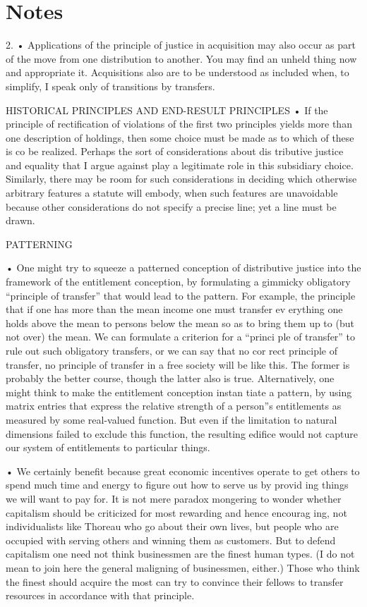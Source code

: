 \documentclass[11pt,openany]{book}
\newcommand{\booknoteshead}{%
  \phantomsection\section*{Notes}%
  \addcontentsline{toc}{section}{Notes}\markright{Notes}}
\begin{document}
\booknoteshead

{\footnotesize\setlength{\parindent}{0pt}\setlength{\parskip}{5pt}

2. • Applications of the principle of justice in acquisition may also occur as part of the move from one distribution to another. You may find an unheld thing now and appropriate it. Acquisitions also are to be understood as included when, to simplify, I speak only of transitions by transfers.\par

HISTORICAL PRINCIPLES AND END-RESULT PRINCIPLES • If the principle of rectification of violations of the first two principles yields more than one description of holdings, then some choice must be made as to which of these is co be realized. Perhaps the sort of considerations about dis tributive justice and equality that I argue against play a legitimate role in this subsidiary choice. Similarly, there may be room for such considerations in deciding which otherwise arbitrary features a statute will embody, when such features are unavoidable because other considerations do not specify a precise line; yet a line must be drawn.\par

PATTERNING\par

• One might try to squeeze a patterned conception of distributive justice into the framework of the entitlement conception, by formulating a gimmicky obligatory ``principle of transfer'' that would lead to the pattern. For example, the principle that if one has more than the mean income one must transfer ev erything one holds above the mean to persons below the mean so as to bring them up to (but not over) the mean. We can formulate a criterion for a ``princi ple of transfer'' to rule out such obligatory transfers, or we can say that no cor rect principle of transfer, no principle of transfer in a free society will be like this. The former is probably the better course, though the latter also is true. Alternatively, one might think to make the entitlement conception instan tiate a pattern, by using matrix entries that express the relative strength of a person''s entitlements as measured by some real-valued function. But even if the limitation to natural dimensions failed to exclude this function, the resulting edifice would not capture our system of entitlements to particular things.\par

• We certainly benefit because great economic incentives operate to get others to spend much time and energy to figure out how to serve us by provid ing things we will want to pay for. It is not mere paradox mongering to wonder whether capitalism should be criticized for most rewarding and hence encourag ing, not individualists like Thoreau who go about their own lives, but people who are occupied with serving others and winning them as customers. But to defend capitalism one need not think businessmen are the finest human types. (I do not mean to join here the general maligning of businessmen, either.) Those who think the finest should acquire the most can try to convince their fellows to transfer resources in accordance with that principle.\par

}
\end{document}
